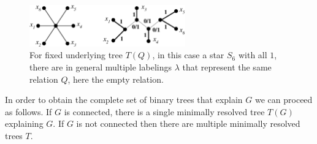 \documentclass[smallextended]{svjour3}
\begin{document}
\begin{figure}[htbp]
\begin{center}
\includegraphics[width=0.6\textwidth]{non_lrt-new.eps}
\end{center}
\caption{For fixed underlying tree $T(Q)$, in this case a star $S_6$ with
  all $1$, there are in general multiple labelings $\lambda$ that represent
  the same relation $Q$, here the empty relation.}
\label{fig:non_lrt}
\end{figure}

 

In order to obtain the complete set of binary trees that explain $G$ we can
proceed as follows. If $G$ is connected, there is a single minimally resolved
tree $T(G)$ explaining $G$. If $G$ is not connected then there are multiple
minimally resolved trees $T$. 
\end{document}
